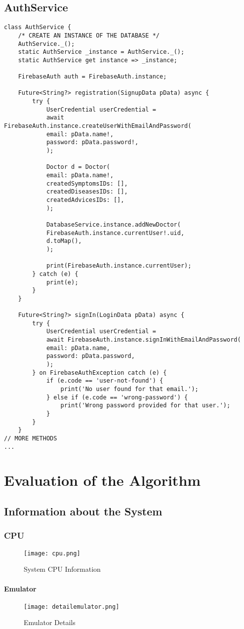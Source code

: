 \section{AuthService}
\begin{lstlisting}[caption=AuthService]
class AuthService {
	/* CREATE AN INSTANCE OF THE DATABASE */
	AuthService._();
	static AuthService _instance = AuthService._();
	static AuthService get instance => _instance;
	
	FirebaseAuth auth = FirebaseAuth.instance;
	
	Future<String?> registration(SignupData pData) async {
		try {
			UserCredential userCredential =
			await FirebaseAuth.instance.createUserWithEmailAndPassword(
			email: pData.name!,
			password: pData.password!,
			);
			
			Doctor d = Doctor(
			email: pData.name!,
			createdSymptomsIDs: [],
			createdDiseasesIDs: [],
			createdAdvicesIDs: [],
			);
			
			DatabaseService.instance.addNewDoctor(
			FirebaseAuth.instance.currentUser!.uid,
			d.toMap(),
			);
			
			print(FirebaseAuth.instance.currentUser);
		} catch (e) {
			print(e);
		}
	}
	
	Future<String?> signIn(LoginData pData) async {
		try {
			UserCredential userCredential =
			await FirebaseAuth.instance.signInWithEmailAndPassword(
			email: pData.name,
			password: pData.password,
			);
		} on FirebaseAuthException catch (e) {
			if (e.code == 'user-not-found') {
				print('No user found for that email.');
			} else if (e.code == 'wrong-password') {
				print('Wrong password provided for that user.');
			}
		}
	}
// MORE METHODS
...
\end{lstlisting}
\chapter{Evaluation of the Algorithm}
\section{Information about the System}
\subsection{CPU}
\begin{figure}[H]
	\centering
	\texttt{[image: cpu.png]}
	\caption{System CPU Information}
\end{figure}
\subsubsection{Emulator}
\begin{figure}[H]
	\centering
	\texttt{[image: detailemulator.png]}
	\caption{Emulator Details}
\end{figure}
\pagebreak
